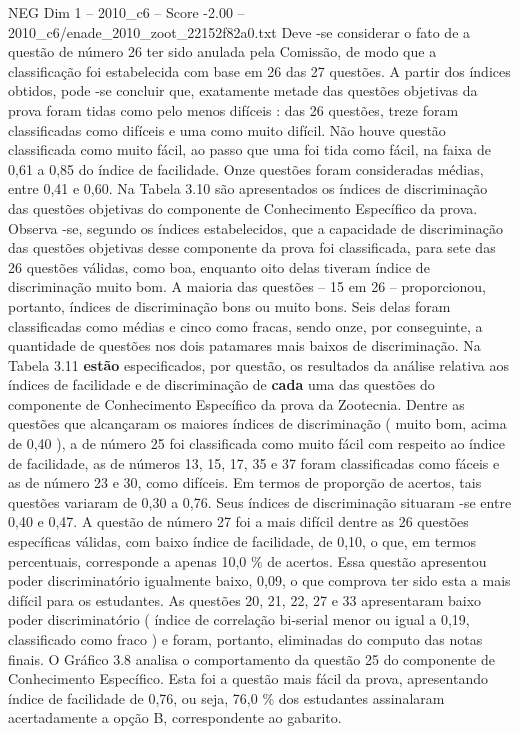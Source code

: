 \begin{textsample}{NEG Dim 1 – 2010\_c6 – Score -2.00 – 2010\_c6/enade\_2010\_zoot\_22152f82a0.txt}
Deve -se considerar o fato de a questão de número 26 ter sido anulada pela Comissão, de modo que a classificação foi estabelecida com base em 26 das 27 questões.
A partir dos índices obtidos, pode -se concluir que, exatamente metade das questões objetivas da prova foram tidas como pelo menos difíceis : das 26 questões, treze foram classificadas como difíceis e uma como muito difícil.
Não houve questão classificada como muito fácil, ao passo que uma foi tida como fácil, na faixa de 0,61 a 0,85 do índice de facilidade.
Onze questões foram consideradas médias, entre 0,41 e 0,60.
Na Tabela 3.10 são apresentados os índices de discriminação das questões objetivas do componente de Conhecimento Específico da prova.
Observa -se, segundo os índices estabelecidos, que a capacidade de discriminação das questões objetivas desse componente da prova foi classificada, para sete das 26 questões válidas, como boa, enquanto oito delas tiveram índice de discriminação muito bom.
A maioria das questões – 15 em 26 – proporcionou, portanto, índices de discriminação bons ou muito bons.
Seis delas foram classificadas como médias e cinco como fracas, sendo onze, por conseguinte, a quantidade de questões nos dois patamares mais baixos de discriminação.
Na Tabela 3.11 \textbf{estão} especificados, por questão, os resultados da análise relativa aos índices de facilidade e de discriminação de \textbf{cada} uma das questões do componente de Conhecimento Específico da prova da Zootecnia.
Dentre as questões que alcançaram os maiores índices de discriminação ( muito bom, acima de 0,40 ), a de número 25 foi classificada como muito fácil com respeito ao índice de facilidade, as de números 13, 15, 17, 35 e 37 foram classificadas como fáceis e as de número 23 e 30, como difíceis.
Em termos de proporção de acertos, tais questões variaram de 0,30 a 0,76.
Seus índices de discriminação situaram -se entre 0,40 e 0,47.
A questão de número 27 foi a mais difícil dentre as 26 questões específicas válidas, com baixo índice de facilidade, de 0,10, o que, em termos percentuais, corresponde a apenas 10,0 \% de acertos.
Essa questão apresentou poder discriminatório igualmente baixo, 0,09, o que comprova ter sido esta a mais difícil para os estudantes.
As questões 20, 21, 22, 27 e 33 apresentaram baixo poder discriminatório ( índice de correlação bi-serial menor ou igual a 0,19, classificado como fraco ) e foram, portanto, eliminadas do computo das notas finais.
O Gráfico 3.8 analisa o comportamento da questão 25 do componente de Conhecimento Específico.
Esta foi a questão mais fácil da prova, apresentando índice de facilidade de 0,76, ou seja, 76,0 \% dos estudantes assinalaram acertadamente a opção B, correspondente ao gabarito.

\end{textsample}
